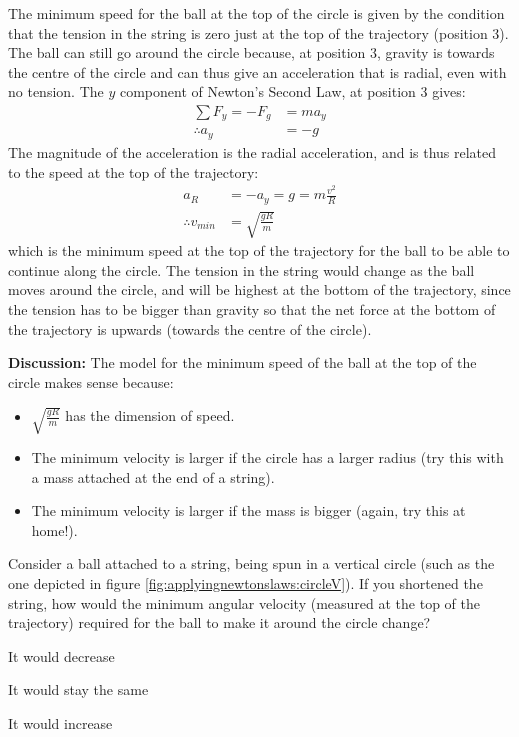 \begin{example}
The minimum speed for the ball at the top of the circle is given by the condition that the tension in the string is zero just at the top of the trajectory (position 3). The ball can still go around the circle because, at position 3, gravity is towards the centre of the circle and can thus give an acceleration that is radial, even with no tension. The $y$ component of Newton's Second Law, at position 3 gives:
\begin{align*}
\sum F_y = -F_g &= ma_y\\
\therefore a_y &=-g
\end{align*}
The magnitude of the acceleration is the radial acceleration, and is thus related to the speed at the top of the trajectory:
\begin{align*}
a_R&=-a_y=g = m\frac{v^2}{R}\\
\therefore v_{min}&=\sqrt{\frac{gR}{m}}
\end{align*}
which is the minimum speed at the top of the trajectory for the ball to be able to continue along the circle. The tension in the string would change as the ball moves around the circle, and will be highest at the bottom of the trajectory, since the tension has to be bigger than gravity so that the net force at the bottom of the trajectory is upwards (towards the centre of the circle).

\textbf{Discussion:} The model for the minimum speed of the ball at the top of the circle makes sense because:
\begin{itemize}
\item $\sqrt{\frac{gR}{m}}$ has the dimension of speed.
\item The minimum velocity is larger if the circle has a larger radius (try this with a mass attached at the end of a string). 
\item The minimum velocity is larger if the mass is bigger (again, try this at home!). 
\end{itemize}
\end{example}

\begin{checkpoint}
\begin{MCquestion}{Consider a ball attached to a string, being spun in a vertical circle (such as the one depicted in figure \ref{fig:applyingnewtonslaws:circleV}). If you shortened the string, how would the minimum angular velocity (measured at the top of the trajectory) required for the ball to make it around the circle change? }
\item It would decrease \correct
\item It would stay the same
\item It would increase
\end{MCquestion}
\end{checkpoint}

